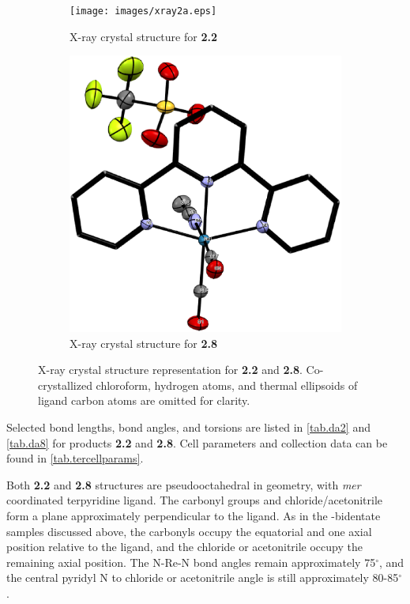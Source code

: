 \begin{figure}[!ht]
 \centering
 \begin{subfigure}[b]{0.49\textwidth}
  \texttt{[image: images/xray2a.eps]}
  \caption{X-ray crystal structure for \textbf{2.2}}
  \label{fig.da2}
 \end{subfigure}
 \begin{subfigure}[b]{0.49\textwidth}
  \includegraphics[clip=true, width=\textwidth, keepaspectratio]{images/xray8a.eps}
  \caption{X-ray crystal structure for \textbf{2.8}}
  \label{fig.da8}
 \end{subfigure}
\caption[X-ray crystal structure representation for \textbf{2} and \textbf{8}.]{X-ray crystal structure representation for \textbf{2.2} and \textbf{2.8}. Co-crystallized chloroform, hydrogen atoms, and thermal ellipsoids of ligand carbon atoms are omitted for clarity.}
\label{fig.xrayter}
\end{figure} 

Selected bond lengths, bond angles, and torsions are listed in \autoref{tab.da2} and \autoref{tab.da8} for products \textbf{2.2} and \textbf{2.8}. Cell parameters and collection data can be found in \autoref{tab.tercellparams}. 

Both \textbf{2.2} and \textbf{2.8} structures are pseudooctahedral in geometry, with \textit{mer} coordinated terpyridine ligand. The carbonyl groups and chloride/acetonitrile form a plane approximately perpendicular to the ligand. As in the -bidentate samples discussed above, the carbonyls occupy the equatorial and one axial position relative to the ligand, and the chloride or acetonitrile occupy the remaining axial position. The N-Re-N bond angles remain approximately 75$^\circ$, and the central pyridyl N to chloride or acetonitrile angle is still approximately 80-85$^\circ$. 

